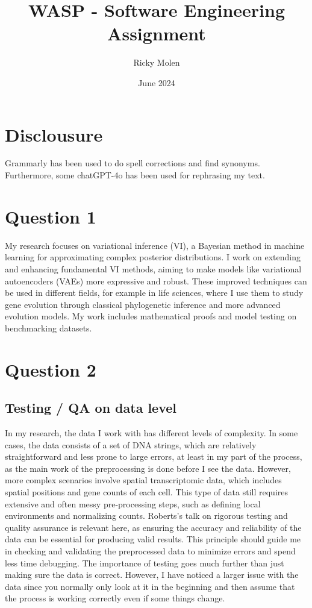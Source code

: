 \documentclass{article}
\title{WASP - Software Engineering Assignment}
\author{Ricky Molen}
\date{June 2024}
\begin{document}
\maketitle

\section{Disclousure}
Grammarly has been used to do spell corrections and find synonyms. Furthermore, some chatGPT-4o has been used for rephrasing my text. 

\section{Question 1}

My research focuses on variational inference (VI), a Bayesian method in machine learning for approximating complex posterior distributions. I work on extending and enhancing fundamental VI methods, aiming to make models like variational autoencoders (VAEs) more expressive and robust. These improved techniques can be used in different fields, for example in life sciences, where I use them to study gene evolution through classical phylogenetic inference and more advanced evolution models. My work includes mathematical proofs and model testing on benchmarking datasets.

\section{Question 2}

\subsection{Testing / QA on data level}
In my research, the data I work with has different levels of complexity. In some cases, the data consists of a set of DNA strings, which are relatively straightforward and less prone to large errors, at least in my part of the process, as the main work of the preprocessing is done before I see the data. However, more complex scenarios involve spatial transcriptomic data, which includes spatial positions and gene counts of each cell. This type of data still requires extensive and often messy pre-processing steps, such as defining local environments and normalizing counts. Roberts's talk on rigorous testing and quality assurance is relevant here, as ensuring the accuracy and reliability of the data can be essential for producing valid results. This principle should guide me in checking and validating the preprocessed data to minimize errors and spend less time debugging. The importance of testing goes much further than just making sure the data is correct. However, I have noticed a larger issue with the data since you normally only look at it in the beginning and then assume that the process is working correctly even if some things change. 
\end{document}
